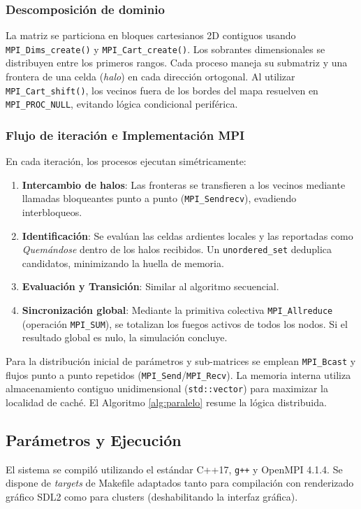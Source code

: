 \documentclass[10pt,a4paper]{article}
\begin{document}
\subsubsection{Descomposición de dominio}
La matriz se particiona en bloques cartesianos 2D contiguos usando \texttt{MPI\_Dims\_create()} y \texttt{MPI\_Cart\_create()}. Los sobrantes dimensionales se distribuyen entre los primeros rangos. Cada proceso maneja su submatriz y una frontera de una celda (\textit{halo}) en cada dirección ortogonal. Al utilizar \texttt{MPI\_Cart\_shift()}, los vecinos fuera de los bordes del mapa resuelven en \texttt{MPI\_PROC\_NULL}, evitando lógica condicional periférica.

\subsubsection{Flujo de iteración e Implementación MPI}
En cada iteración, los procesos ejecutan simétricamente:
\begin{enumerate}
    \item \textbf{Intercambio de halos}: Las fronteras se transfieren a los vecinos mediante llamadas bloqueantes punto a punto (\texttt{MPI\_Sendrecv}), evadiendo interbloqueos.
    \item \textbf{Identificación}: Se evalúan las celdas ardientes locales y las reportadas como \textit{Quemándose} dentro de los halos recibidos. Un \texttt{unordered\_set} deduplica candidatos, minimizando la huella de memoria.
    \item \textbf{Evaluación y Transición}: Similar al algoritmo secuencial.
    \item \textbf{Sincronización global}: Mediante la primitiva colectiva \texttt{MPI\_Allreduce} (operación \texttt{MPI\_SUM}), se totalizan los fuegos activos de todos los nodos. Si el resultado global es nulo, la simulación concluye.
\end{enumerate}

Para la distribución inicial de parámetros y sub-matrices se emplean \texttt{MPI\_Bcast} y flujos punto a punto repetidos (\texttt{MPI\_Send}/\texttt{MPI\_Recv}). La memoria interna utiliza almacenamiento contiguo unidimensional (\texttt{std::vector}) para maximizar la localidad de caché. El Algoritmo \ref{alg:paralelo} resume la lógica distribuida.

\subsection{Parámetros y Ejecución}
El sistema se compiló utilizando el estándar C++17, \texttt{g++} y OpenMPI 4.1.4. Se dispone de \textit{targets} de Makefile adaptados tanto para compilación con renderizado gráfico SDL2 como para clusters (deshabilitando la interfaz gráfica).
\end{document}
